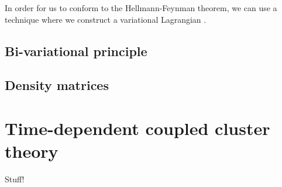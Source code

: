             In order for us to conform to the Hellmann-Feynman theorem, we can
            use a technique where we construct a variational Lagrangian
            \cite{helgaker1989}.

        \subsection{Bi-variational principle}
        \subsection{Density matrices}

    \section{Time-dependent coupled cluster theory}
        Stuff!

